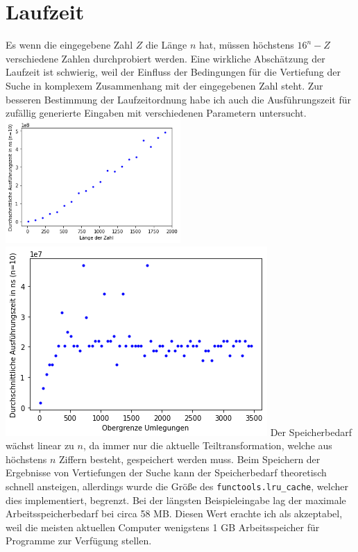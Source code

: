 \documentclass[a4paper,10pt,ngerman]{scrartcl}
\begin{document}
\section{Laufzeit}
Es wenn die eingegebene Zahl $Z$ die Länge $n$ hat, müssen höchstens $16^n-Z$ verschiedene Zahlen durchprobiert werden. Eine wirkliche Abschätzung der Laufzeit ist schwierig, weil der Einfluss der Bedingungen für die Vertiefung der Suche in komplexem Zusammenhang mit der eingegebenen Zahl steht. Zur besseren Bestimmung der Laufzeitordnung habe ich auch die Ausführungszeit für zufällig generierte Eingaben mit verschiedenen Parametern untersucht. \\
\includegraphics[width=0.5\textwidth]{laufzeit1} \includegraphics[width=.5\textwidth]{laufzeit2} Der Speicherbedarf wächst linear zu $n$, da immer nur die aktuelle Teiltransformation, welche aus höchstens $n$ Ziffern besteht, gespeichert werden muss. Beim Speichern der Ergebnisse von Vertiefungen der Suche kann der Speicherbedarf theoretisch schnell ansteigen, allerdings wurde die Größe des \lstinline|functools.lru_cache|, welcher dies implementiert, begrenzt. Bei der längsten Beispieleingabe lag der maximale Arbeitsspeicherbedarf bei circa 58 MB. Diesen Wert erachte ich als akzeptabel, weil die meisten aktuellen Computer wenigstens 1 GB Arbeitsspeicher für Programme zur Verfügung stellen.
\end{document}
